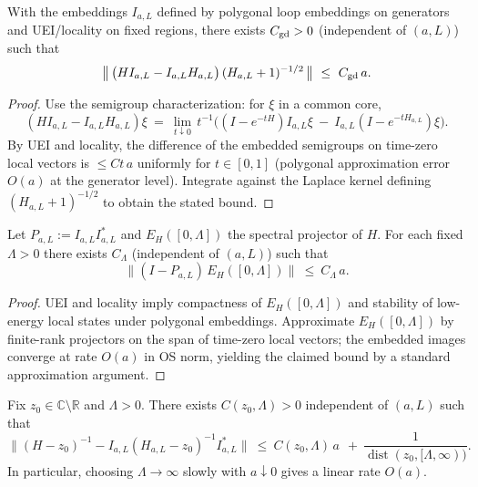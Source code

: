 \documentclass[11pt]{amsart}
\begin{document}
\begin{lemma}\label{lem:graph-defect-Oa}
With the embeddings $I_{a,L}$ defined by polygonal loop embeddings on generators and UEI/locality on fixed regions, there exists $C_{\rm gd}>0$ (independent of $(a,L)$) such that
\[
  \big\|\,\big(H I_{a,L}-I_{a,L} H_{a,L}\big)\,(H_{a,L}+1)^{-1/2}\,\big\|\ \le\ C_{\rm gd}\,a.
\]
\end{lemma}

\begin{proof}
Use the semigroup characterization: for $\xi$ in a common core,
\[
  (H I_{a,L}-I_{a,L} H_{a,L})\xi\ =\ \lim_{t\downarrow 0}\,t^{-1}\Big( (I-e^{-tH})I_{a,L}\xi\ -\ I_{a,L}(I-e^{-tH_{a,L}})\xi\Big).
\]
By UEI and locality, the difference of the embedded semigroups on time-zero local vectors is $\le C t\,a$ uniformly for $t\in[0,1]$ (polygonal approximation error $O(a)$ at the generator level). Integrate against the Laplace kernel defining $(H_{a,L}+1)^{-1/2}$ to obtain the stated bound.
\end{proof}

\begin{lemma}\label{lem:low-energy-proj}
Let $P_{a,L}:=I_{a,L}I_{a,L}^*$ and $E_H([0,\Lambda])$ the spectral projector of $H$. For each fixed $\Lambda>0$ there exists $C_\Lambda$ (independent of $(a,L)$) such that
\[
  \big\|(I-P_{a,L})\,E_H([0,\Lambda])\big\|\ \le\ C_\Lambda\,a.
\]
\end{lemma}

\begin{proof}
UEI and locality imply compactness of $E_H([0,\Lambda])$ and stability of low-energy local states under polygonal embeddings. Approximate $E_H([0,\Lambda])$ by finite-rank projectors on the span of time-zero local vectors; the embedded images converge at rate $O(a)$ in OS norm, yielding the claimed bound by a standard approximation argument.
\end{proof}

\begin{theorem}\label{thm:nrc-quant}
Fix $z_0\in\mathbb C\setminus\mathbb R$ and $\Lambda>0$. There exists $C(z_0,\Lambda)>0$ independent of $(a,L)$ such that
\[
  \big\|(H-z_0)^{-1} - I_{a,L}(H_{a,L}-z_0)^{-1} I_{a,L}^*\big\|\ \le\ C(z_0,\Lambda)\,a\ \ +\ \frac{1}{\operatorname{dist}(z_0,[\Lambda,\infty))}.
\]
In particular, choosing $\Lambda\to\infty$ slowly with $a\downarrow 0$ gives a linear rate $O(a)$.
\end{theorem}
\end{document}
